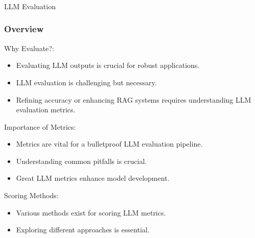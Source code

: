 \begin{frame}[fragile]\frametitle{}
\begin{center}
{\Large LLM Evaluation}
\end{center}
\end{frame}

\begin{frame}[fragile]\frametitle{Overview}
Why Evaluate?:
  \begin{itemize}
    \item Evaluating LLM outputs is crucial for robust applications.
    \item LLM evaluation is challenging but necessary.
    \item Refining accuracy or enhancing RAG systems requires understanding LLM evaluation metrics.
  \end{itemize}

Importance of Metrics:
  \begin{itemize}
    \item Metrics are vital for a bulletproof LLM evaluation pipeline.
    \item Understanding common pitfalls is crucial.
    \item Great LLM metrics enhance model development.
  \end{itemize}
  
Scoring Methods:
  \begin{itemize}
    \item Various methods exist for scoring LLM metrics.
    \item Exploring different approaches is essential.
  \end{itemize}
\end{frame}

